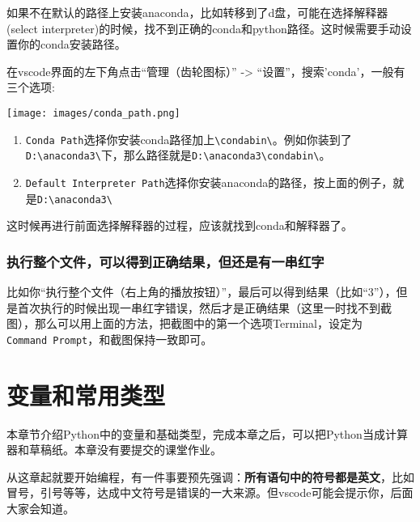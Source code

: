 \documentclass[
  letterpaper,
  DIV=11,
  numbers=noendperiod]{scrreprt}
\providecommand{\tightlist}{%
  \setlength{\itemsep}{0pt}\setlength{\parskip}{0pt}}\usepackage{longtable,booktabs,array}
\begin{document}
如果不在默认的路径上安装anaconda，比如转移到了d盘，可能在选择解释器(select
interpreter)的时候，找不到正确的conda和python路径。这时候需要手动设置你的conda安装路径。

在vscode界面的左下角点击``管理（齿轮图标）'' -\textgreater{}
``设置''，搜索'conda'，一般有三个选项:

\texttt{[image: images/conda\_path.png]}

\begin{enumerate}
\def\labelenumi{\arabic{enumi}.}
\tightlist
\item
  \texttt{Conda\ Path}选择你安装conda路径加上\texttt{\textbackslash{}condabin\textbackslash{}}。例如你装到了\texttt{D:\textbackslash{}anaconda3\textbackslash{}}下，那么路径就是\texttt{D:\textbackslash{}anaconda3\textbackslash{}condabin\textbackslash{}}。
\item
  \texttt{Default\ Interpreter\ Path}选择你安装anaconda的路径，按上面的例子，就是\texttt{D:\textbackslash{}anaconda3\textbackslash{}}
\end{enumerate}

这时候再进行前面选择解释器的过程，应该就找到conda和解释器了。

\hypertarget{ux6267ux884cux6574ux4e2aux6587ux4ef6ux53efux4ee5ux5f97ux5230ux6b63ux786eux7ed3ux679cux4f46ux8fd8ux662fux6709ux4e00ux4e32ux7ea2ux5b57}{%
\subsection{执行整个文件，可以得到正确结果，但还是有一串红字}\label{ux6267ux884cux6574ux4e2aux6587ux4ef6ux53efux4ee5ux5f97ux5230ux6b63ux786eux7ed3ux679cux4f46ux8fd8ux662fux6709ux4e00ux4e32ux7ea2ux5b57}}

比如你``执行整个文件（右上角的播放按钮）''，最后可以得到结果（比如``3''），但是首次执行的时候出现一串红字错误，然后才是正确结果（这里一时找不到截图），那么可以用上面的方法，把截图中的第一个选项Terminal，设定为\texttt{Command\ Prompt}，和截图保持一致即可。

\hypertarget{ux53d8ux91cfux548cux5e38ux7528ux7c7bux578b}{%
\chapter{变量和常用类型}\label{ux53d8ux91cfux548cux5e38ux7528ux7c7bux578b}}

本章节介绍Python中的变量和基础类型，完成本章之后，可以把Python当成计算器和草稿纸。本章没有要提交的课堂作业。

从这章起就要开始编程，有一件事要预先强调：\textbf{所有语句中的符号都是英文}，比如冒号，引号等等，达成中文符号是错误的一大来源。但vscode可能会提示你，后面大家会知道。
\end{document}
